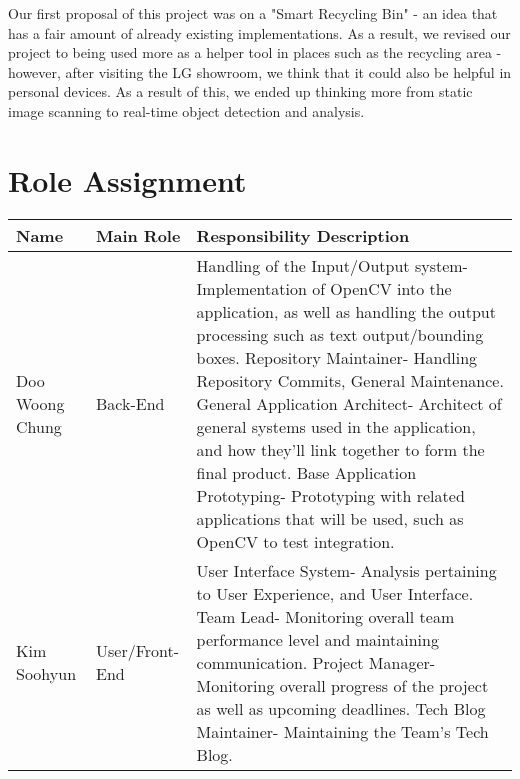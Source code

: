 \documentclass[conference]{IEEEtran}
\begin{document}
Our first proposal of this project was on a "Smart Recycling Bin" - an idea that has a fair amount of already existing implementations. As a result, we revised our project to being used more as a helper tool in places such as the recycling area - however, after visiting the LG showroom, we think that it could also be helpful in personal devices. As a result of this, we ended up thinking more from static image scanning to real-time object detection and analysis.

\newpage

\section{Role Assignment}

\begin{table}[htbp]
\begin{tabular}{|p{1.5cm}|p{1.5cm}|p{4.7cm}|}
\hline
\textbf{Name} & \textbf{Main Role} & \textbf{Responsibility Description}\\ \hline
Doo Woong Chung & Back-End & 
\newline Handling of the Input/Output system\newline- Implementation of OpenCV into the application, as well as handling the output processing such as text output/bounding boxes.
\newline 
\newline Repository Maintainer\newline- Handling Repository Commits, General Maintenance.
\newline 
\newline General Application Architect\newline- Architect of general systems used in the application, and how they'll link together to form the final product. 
\newline 
\newline Base Application Prototyping\newline- Prototyping with related applications that will be used, such as OpenCV to test integration. \\ \hline

Kim Soohyun & User/Front-End & 
\newline User Interface System\newline- Analysis pertaining to User Experience, and User Interface.
\newline 
\newline Team Lead\newline- Monitoring overall team performance level and maintaining communication.
\newline 
\newline Project Manager\newline- Monitoring overall progress of the project as well as upcoming deadlines.
\newline 
\newline Tech Blog Maintainer\newline- Maintaining the Team's Tech Blog.
\\ \hline


\end{tabular}
\end{table}
\end{document}
